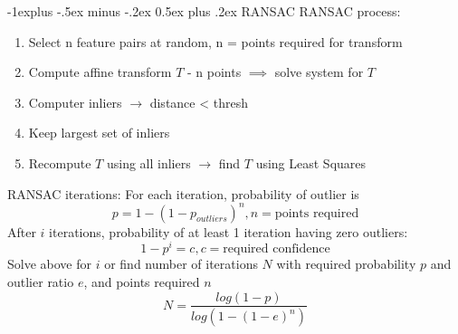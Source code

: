 \documentclass[10pt,landscape]{article}
\makeatletter
\renewcommand{\subsection}{\@startsection{subsection}{2}{0mm}%
                                {-1explus -.5ex minus -.2ex}%
                                {0.5ex plus .2ex}%
                                {\normalfont\normalsize\bfseries}}
\makeatother
\begin{document}
\begin{multicols}{3}
\subsection{RANSAC}
RANSAC process: 
\begin{enumerate}
        \item Select n feature pairs at random, n = points required for transform
        \item Compute affine transform $T$ - n points $\implies$ solve system for $T$ 
        \item Computer inliers $\rightarrow$ distance < thresh
        \item Keep largest set of inliers
        \item Recompute $T$ using all inliers $\rightarrow$ find $T$ using Least Squares
\end{enumerate}
RANSAC iterations:
For each iteration, probability of outlier is
\[
   p = 1 - (1 - p_{outliers})^n, n = \text{points required}   
\]
After $i$ iterations, probability of at least 1 iteration having zero outliers:
\[
   1 - p^i = c, c = \text{required confidence}     
\]
Solve above for $i$ or find number of iterations $N$ with required probability $p$ and outlier ratio $e$, and points required $n$
\[
   N = \frac{log(1-p)}{log(1-(1-e)^n)}     
\]

\end{multicols}
\end{document}
